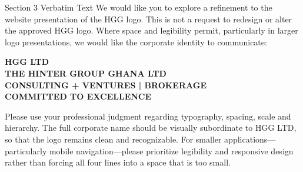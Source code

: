 \documentclass[11pt,a4paper]{article}
\begin{document}
\begin{VerbatimClientBox}{Section 3 Verbatim Text}
We would like you to explore a refinement to the website presentation of the HGG logo.
This is not a request to redesign or alter the approved HGG logo.
Where space and legibility permit, particularly in larger logo presentations, we would like the corporate identity to communicate:
\begin{center}
\textbf{HGG LTD} \\
\textbf{THE HINTER GROUP GHANA LTD} \\
\textbf{CONSULTING + VENTURES | BROKERAGE} \\
\textbf{COMMITTED TO EXCELLENCE}
\end{center}
Please use your professional judgment regarding typography, spacing, scale and hierarchy.
The full corporate name should be visually subordinate to HGG LTD, so that the logo remains clean and recognizable.
For smaller applications---particularly mobile navigation---please prioritize legibility and responsive design rather than forcing all four lines into a space that is too small.
\end{VerbatimClientBox}
\end{document}
